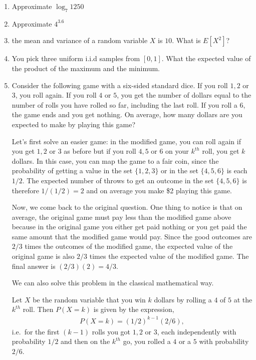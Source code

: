 \documentclass{amsart}
\theoremstyle{plain}
\numberwithin{equation}{section}
\begin{document}
\begin{enumerate}
\item Approximate $\log_{7}1250$ 

\item Approximate $4^{3.6}$

\item the mean and variance of a random variable $X$ is $10$. What is
$E[X^2]$?

\item You pick three uniform i.i.d samples from $[0,1]$. What the 
expected value of the product of the maximum and the minimum.

\item Consider the following game with a six-sided standard dice. 
If you roll $1,2$ or $3$, you roll again. If you 
roll $4$ or $5$, you get the number of dollars equal 
to the number of rolls you have rolled so far, including the last
roll. If you roll a $6$, the game ends and you get nothing. On 
average, how many dollars are you expected to make by 
playing this game?

Let's first solve an easier game: in the modified game, you can
roll again if you get $1, 2$ or $3$ as before but 
if you roll $4,5$ or $6$ on your $k^{th}$ roll, you get 
$k$ dollars. In this case, you can map the game to a fair 
coin, since the 
probability of getting a value in the set $\{ 1,2,3 \}$ or 
in the set $\{ 4,5,6 \}$ is each $1/2$. The expected number of 
throws to get an outcome in the set $\{4, 5, 6 \}$ is 
therefore $1/(1/2)=2$ and on average you make \$2 playing this 
game. 

Now, we come back to the original question. One thing to notice is
that on average, the original game must pay less than the modified 
game above because in the original game you either get paid nothing 
or you get paid the same amount that the modified game would pay. 
Since the good outcomes are $2/3$ times the outcomes of the 
modified game, the expected value of the original game is 
also $2/3$ times the expected value of the modified game.
The final answer is  $(2/3)(2) = 4/3$.

We can also solve this problem in the classical mathematical way.

Let $X$ be the random variable that you win $k$ dollars 
by rolling a $4$ of $5$ at the $k^{th}$ roll. Then 
$P(X=k)$ is given by the expression,
\begin{align*}
P(X=k) = (1/2)^{k-1}(2/6),
\end{align*}
i.e.\ for the first $(k-1)$ rolls you got $1,2$ or $3$, each independently 
with probability $1/2$ and then on the $k^{th}$ go, you rolled 
a $4$ or a $5$ with probability $2/6$.


\end{enumerate}
\end{document}

